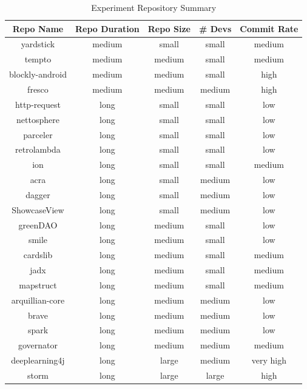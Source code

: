\begin{table}
\begin{center}
    \begin{tabular}{|c|c|c|c|c|}
        \hline
        \textbf{Repo Name} & \textbf{Repo Duration} & \textbf{Repo Size} & \textbf{\# Devs} & \textbf{Commit Rate} \\
        \hline
        \hline
        yardstick & medium & small & small & medium \\
        \hline
        tempto & medium & medium & small & medium \\
        \hline
        blockly-android & medium & medium & small & high \\
        \hline
        fresco & medium & medium & medium & high \\
        \hline
        http-request & long & small & small & low \\
        nettosphere & long & small & small & low \\
        parceler & long & small & small & low \\
        retrolambda & long & small & small & low \\
        \hline
        ion & long & small & small & medium \\
        \hline
        acra & long & small & medium & low \\
        dagger & long & small & medium & low \\
        ShowcaseView & long & small & medium & low \\
        \hline
        greenDAO & long & medium & small & low \\
        smile & long & medium & small & low \\
        \hline
        cardslib & long & medium & small & medium \\
        jadx & long & medium & small & medium \\        
        mapstruct & long & medium & small & medium \\
        \hline
        arquillian-core & long & medium & medium & low \\
        brave & long & medium & medium & low \\
        spark & long & medium & medium & low \\
        \hline    
        
        governator & long & medium & medium & medium \\
        \hline
        deeplearning4j & long & large & medium & very high \\
        \hline
        storm & long & large & large & high \\
        \hline
    \end{tabular}
\end{center}
\caption{Experiment Repository Summary}
\label{tab:repository_size_summary}
\end{table}

